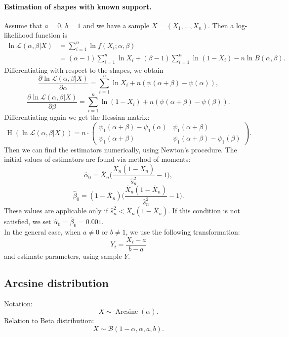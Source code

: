 \documentclass[a4paper,11pt]{article}
\theoremstyle{plain}
\theoremstyle{definition}
\begin{document}
	\paragraph{Estimation of shapes with known support.} Assume that $a=0$, $b=1$ and we have a sample $X = (X_1, \dots, X_n)$. Then a log-likelihood function is
	\begin{equation} \label{Beta log-likelihood}
	\begin{aligned}
	\ln \mathcal{L} (\alpha, \beta | X) &= \sum_{i=1}^{n} \ln f(X_i; \alpha, \beta) \\
	& = (\alpha - 1) \sum_{i=1}^{n} \ln X_i + (\beta - 1) \sum_{i=1}^{n}\ln (1-X_i) - n \ln B(\alpha, \beta).
	\end{aligned}  
	\end{equation}
	Differentiating with respect to the shapes, we obtain
	\[
	\frac{\partial \ln \mathcal{L}(\alpha, \beta | X)}{\partial \alpha} = \sum_{i=1}^{n} \ln X_i + n(\psi(\alpha + \beta) - \psi(\alpha)),
	 \]
	\[
	\frac{\partial \ln \mathcal{L}(\alpha, \beta | X)}{\partial \beta} = \sum_{i=1}^{n} \ln (1-X_i) + n(\psi(\alpha + \beta) - \psi(\beta)).
	\]
	Differentiating again we get the Hessian matrix:
	\[
	\operatorname{H}(\ln\mathcal{L}(\alpha,\beta|X)) = n \cdot \begin{pmatrix}
	\psi_1(\alpha+\beta)-\psi_1(\alpha) & \psi_1(\alpha+\beta) \\
	\psi_1(\alpha+\beta) & \psi_1(\alpha+\beta)-\psi_1(\beta)
	\end{pmatrix}.
	\]
	Then we can find the estimators numerically, using Newton's procedure. The initial values of estimators are found via method of moments:
	\[
	\hat{\alpha}_0 = \overline{X}_n \Bigg( \frac{\overline{X}_n(1-\overline{X}_n)}{\hat{s}_n^2} - 1 \Bigg),
	\]
	\[
	\hat{\beta}_0 = (1-\overline{X}_n) \Bigg( \frac{\overline{X}_n(1-\overline{X}_n)}{\hat{s}_n^2} - 1 \Bigg).
	\]
	These values are applicable only if $\hat{s}_n^2 < \overline{X}_n(1-\overline{X}_n)$. If this condition is not satisfied, we set $\hat{\alpha}_0 = \hat{\beta}_0 = 0.001$.\\
	In the general case, when $a \neq 0$ or $b \neq 1$, we use the following transformation:
	\[ Y_i = \frac{X_i - a}{b - a} \]
	and estimate parameters, using sample $Y$.
	
	\subsection{Arcsine distribution}
	Notation:
	\[
	X \sim \operatorname{Arcsine}(\alpha).
	\]
	Relation to Beta distribution: \[ X \sim \mathcal{B}(1-\alpha, \alpha, a, b). \]
\end{document}
